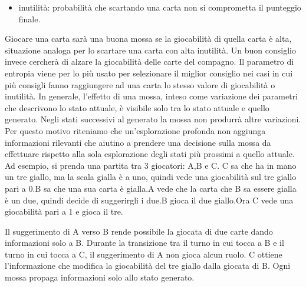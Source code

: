 \documentclass{article}
\begin{document}
\begin{flushleft}
\begin{itemize}
    \item inutilità: probabilità che scartando una carta non si comprometta il punteggio finale.
\end{itemize}
Giocare una carta sarà una buona mossa se la giocabilità di quella carta è alta, situazione analoga per lo scartare una carta con alta inutilità. Un buon consiglio invece cercherà di alzare la giocabilità delle carte del compagno. Il parametro di entropia viene per lo più usato per selezionare il miglior consiglio nei casi in cui più consigli fanno raggiungere ad una carta lo stesso valore di giocabilità o inutilità.\newline
\newline
In generale, l'effetto di una mossa, inteso come variazione dei parametri che descrivono lo stato attuale, è visibile solo tra lo stato attuale e quello generato. Negli stati successivi al generato la mossa non produrrà altre variazioni.\newline
Per questo motivo riteniamo che un'esplorazione profonda non aggiunga informazioni rilevanti che aiutino a prendere una decisione sulla mossa da effettuare rispetto alla sola esplorazione degli stati più prossimi a quello attuale. \newline
\newline
Ad esempio, si prenda una partita tra 3 giocatori: A,B e C.\newline
C sa che ha in mano un tre giallo, ma la scala gialla è a uno, quindi vede una giocabilità sul tre giallo pari a 0.\newline B sa che una sua carta è gialla.\newline A vede che la carta che B sa essere gialla è un due, quindi decide di suggerirgli i due.\newline B gioca il due giallo.\newline Ora C vede una giocabilità pari a 1 e gioca il tre.\newline
\newline

Il suggerimento di A verso B rende possibile la giocata di due carte dando informazioni solo a B. Durante la transizione tra il turno in cui tocca a B e il turno in cui tocca a C, il suggerimento di A non gioca alcun ruolo. C ottiene l'informazione che modifica la giocabilità del tre giallo dalla giocata di B.\newline
Ogni mossa propaga informazioni solo allo stato generato. \newline
\newline


\end{flushleft}
\end{document}
